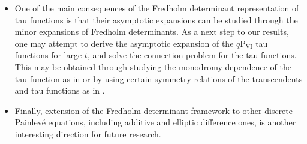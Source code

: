 \documentclass[a4paper,reqno,11pt]{amsart}
\numberwithin{equation}{section}
\numberwithin{figure}{section}
\theoremstyle{plain}
\theoremstyle{remark}
\newcommand\Psix{\textrm{P}_{\textrm{VI}}}
\numberwithin{rhp}{section}
\begin{document}
\begin{itemize}[leftmargin=*]
\item One of the main consequences of the Fredholm determinant representation of tau functions is that their asymptotic expansions can be studied through the minor expansions of Fredholm determinants. As a next step to our results, one may attempt to derive the asymptotic expansion of the $q\Psix$ tau functions for large $t$, and solve the connection problem for the tau functions. This may be obtained through studying the monodromy dependence of the tau function as in \cite{ILP2016} or by using certain symmetry relations of the transcendents and tau functions as in \cite{gavrylenko2025riemannhilbertproblemsfredholmdeterminants}. 

\item Finally, extension of the Fredholm determinant framework to other discrete Painlev\'e equations, including additive and elliptic difference ones, is another interesting direction for future research.
\end{itemize}












% 

%








  
\end{document}
